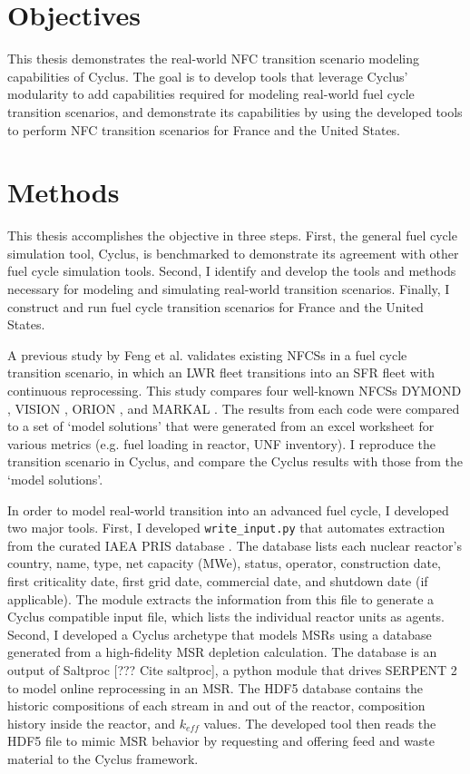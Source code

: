 \section{Objectives}

This thesis demonstrates the real-world \gls{NFC} transition
scenario modeling capabilities of Cyclus. The goal is to
develop tools that leverage Cyclus' modularity to
add capabilities required for modeling real-world
fuel cycle transition scenarios, and demonstrate its
capabilities by using the developed tools to perform
\gls{NFC} transition scenarios for France and the United
States.

\section{Methods}
This thesis accomplishes the objective in three steps. First,
the general fuel cycle simulation tool, Cyclus, is benchmarked
to demonstrate its agreement with other fuel cycle simulation
tools. Second, I identify and develop the tools and methods necessary
for modeling and simulating real-world transition scenarios.
Finally, I construct and run fuel cycle transition scenarios
for France and the United States.

A previous study by Feng et al. \cite{feng_standardized_2016} validates existing 
\glspl{NFCS} in a fuel cycle transition scenario, in which an \gls{LWR} fleet
transitions into an \gls{SFR} fleet with continuous reprocessing. This 
study compares four well-known \glspl{NFCS}
DYMOND \cite{yacout_modeling_2005},
VISION \cite{jacobson_verifiable_2010},
ORION \cite{gregg_analysis_2012}, and
MARKAL \cite{shay_epa_2006}. The results from each code were
compared to a set of `model solutions' that were generated
from an excel worksheet for various metrics (e.g. fuel loading
in reactor, \gls{UNF} inventory). I reproduce the transition
scenario in Cyclus, and compare the Cyclus results with those
from the `model solutions'.

In order to model real-world transition into an advanced
fuel cycle, I developed two major tools. First, I developed \texttt{write\_input.py}
that automates extraction from the curated \gls{IAEA} \gls{PRIS} database
\cite{iaea_nuclear_2018}. The database lists each nuclear reactor's
country, name, type, net capacity (\gls{MWe}), status, operator, construction
date, first criticality date, first grid date, commercial date, and shutdown
date (if applicable). The module extracts the information from this file
to generate a Cyclus compatible input file, which lists the individual
reactor units as agents. Second, I developed a Cyclus archetype that models \glspl{MSR}
using a database generated from a high-fidelity \gls{MSR} depletion calculation.
The database is an output of Saltproc [??? Cite saltproc], a python
module that drives
SERPENT 2 \cite{leppanen_serpentcontinuous-energy_2013} to model online reprocessing in an \gls{MSR}.
The HDF5 database contains the historic compositions of each stream in and out of the reactor,
composition history inside the reactor, and $k_{eff}$ values. The developed tool then
reads the HDF5 file to mimic \gls{MSR} behavior by requesting and offering
feed and waste material to the Cyclus framework.

